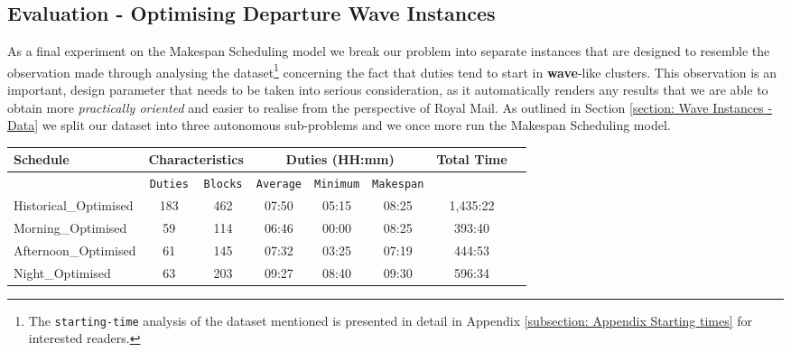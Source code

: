 
\subsection*{Evaluation - Optimising Departure Wave Instances}
As a final experiment on the Makespan Scheduling model we break our problem into separate instances that are designed to resemble the observation made through analysing the dataset\footnote{The \texttt{starting-time} analysis of the dataset mentioned is presented in detail in Appendix \ref{subsection: Appendix Starting times} for interested readers.} concerning the fact that duties tend to start in \textbf{wave}-like clusters. This observation is an important, design parameter that needs to be taken into serious consideration, as it automatically renders any results that we are able to obtain more \textit{practically oriented} and easier to realise from the perspective of Royal Mail. As outlined in Section \ref{section: Wave Instances - Data} we split our dataset into three autonomous sub-problems and we once more run the Makespan Scheduling model.


\begin{table}[h]
\small
    \centering 
    \begin{tabular}{|l|c|c|c|c|c|c|c|}
        \hline
        \textbf{Schedule} & \multicolumn{2}{|c|}{ \textbf{Characteristics}} & \multicolumn{3}{|c|}{ \textbf{Duties (HH:mm)}} & \textbf{Total Time}  \\
        \hline
        & \texttt{Duties} & \texttt{Blocks} & \texttt{Average} &  \texttt{Minimum} & \texttt{Makespan} & \\
        \hline
        Historical\_Optimised & 183 & 462  & 07:50 & 05:15 & 08:25 & 1,435:22 \\
        \hline
        Morning\_Optimised & 59 & 114 & 06:46 & 00:00 & 08:25 & 393:40 \\
        \hline
        Afternoon\_Optimised & 61 & 145 & 07:32 & 03:25 & 07:19 & 444:53 \\
        \hline
        Night\_Optimised & 63 & 203 & 09:27 & 08:40 & 09:30 & 596:34 \\
        \hline
    \end{tabular}%
    \medbreak
\end{table}

